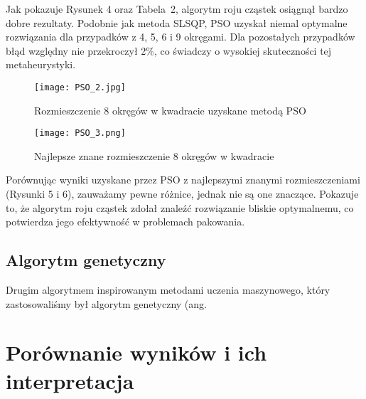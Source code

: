 \documentclass{article}
\begin{document}
Jak pokazuje Rysunek 4 oraz Tabela~2, algorytm roju cząstek osiągnął bardzo dobre rezultaty. Podobnie jak metoda SLSQP, PSO uzyskał niemal optymalne rozwiązania dla przypadków z 4, 5, 6 i 9 okręgami. Dla pozostałych przypadków błąd względny nie przekroczył 2\%, co świadczy o wysokiej skuteczności tej metaheurystyki.

\begin{figure}[H]
    \centering
    \begin{minipage}{0.59\linewidth}
        \texttt{[image: PSO\_2.jpg]}
        \caption{Rozmieszczenie 8 okręgów w kwadracie uzyskane metodą PSO}
        \label{fig:pso-layout}
    \end{minipage}
    \hfill
    \begin{minipage}{0.4\linewidth}
        \texttt{[image: PSO\_3.png]}
        \caption{Najlepsze znane rozmieszczenie 8 okręgów w kwadracie}
        \label{fig:best-pso-layout}
    \end{minipage}
\end{figure}

Porównując wyniki uzyskane przez PSO z najlepszymi znanymi rozmieszczeniami (Rysunki 5 i 6), zauważamy pewne różnice, jednak nie są one znaczące. Pokazuje to, że algorytm roju cząstek zdołał znaleźć rozwiązanie bliskie optymalnemu, co potwierdza jego efektywność w problemach pakowania.



\subsection{Algorytm genetyczny}
Drugim algorytmem inspirowanym metodami uczenia maszynowego, który zastosowaliśmy był algorytm genetyczny (ang. 
\section{Porównanie wyników i ich interpretacja}
\end{document}
